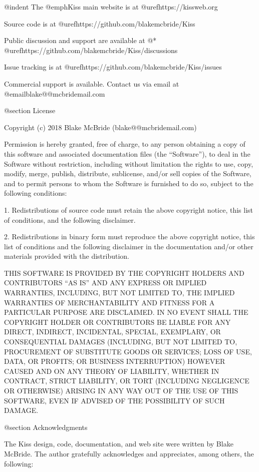 @indent
The @emph{Kiss} main website is at @uref{https://kissweb.org}

Source code is at @uref{https://github.com/blakemcbride/Kiss}

Public discussion and support are available at @* 
@uref{https://github.com/blakemcbride/Kiss/discussions}

Issue tracking is at @uref{https://github.com/blakemcbride/Kiss/issues}

Commercial support is available.  Contact us via email at @email{blake@@mcbridemail.com}

@section License

Copyright (c) 2018 Blake McBride (blake@@mcbridemail.com)

Permission is hereby granted, free of charge, to any person obtaining
a copy of this software and associated documentation files (the
``Software''), to deal in the Software without restriction, including
without limitation the rights to use, copy, modify, merge, publish,
distribute, sublicense, and/or sell copies of the Software, and to
permit persons to whom the Software is furnished to do so, subject to
the following conditions:

1. Redistributions of source code must retain the above copyright
notice, this list of conditions, and the following disclaimer.

2. Redistributions in binary form must reproduce the above copyright
notice, this list of conditions and the following disclaimer in the
documentation and/or other materials provided with the distribution.

THIS SOFTWARE IS PROVIDED BY THE COPYRIGHT HOLDERS AND CONTRIBUTORS
``AS IS'' AND ANY EXPRESS OR IMPLIED WARRANTIES, INCLUDING, BUT NOT
LIMITED TO, THE IMPLIED WARRANTIES OF MERCHANTABILITY AND FITNESS FOR
A PARTICULAR PURPOSE ARE DISCLAIMED. IN NO EVENT SHALL THE COPYRIGHT
HOLDER OR CONTRIBUTORS BE LIABLE FOR ANY DIRECT, INDIRECT, INCIDENTAL,
SPECIAL, EXEMPLARY, OR CONSEQUENTIAL DAMAGES (INCLUDING, BUT NOT
LIMITED TO, PROCUREMENT OF SUBSTITUTE GOODS OR SERVICES; LOSS OF USE,
DATA, OR PROFITS; OR BUSINESS INTERRUPTION) HOWEVER CAUSED AND ON ANY
THEORY OF LIABILITY, WHETHER IN CONTRACT, STRICT LIABILITY, OR TORT
(INCLUDING NEGLIGENCE OR OTHERWISE) ARISING IN ANY WAY OUT OF THE USE
OF THIS SOFTWARE, EVEN IF ADVISED OF THE POSSIBILITY OF SUCH DAMAGE.

@section Acknowledgments

The Kiss design, code, documentation, and web site were written by
Blake McBride.  The author gratefully acknowledges and appreciates,
among others, the following:

